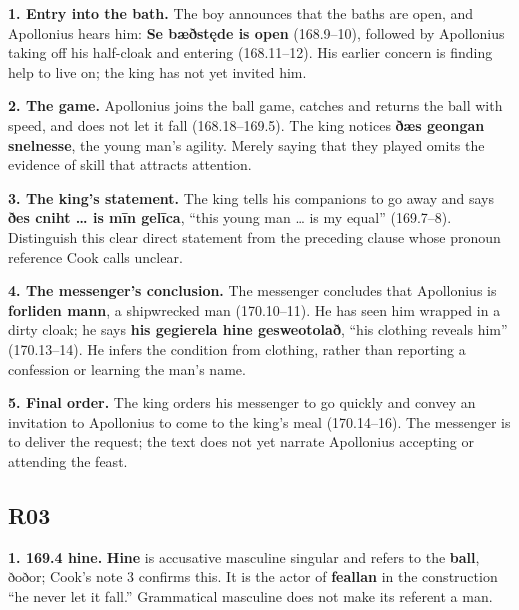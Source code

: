\textbf{1. Entry into the bath.} The boy announces that the baths are open, and Apollonius hears him: \textbf{Se bæðstęde is open} (168.9–10), followed by Apollonius taking off his half-cloak and entering (168.11–12). His earlier concern is finding help to live on; the king has not yet invited him.

\textbf{2. The game.} Apollonius joins the ball game, catches and returns the ball with speed, and does not let it fall (168.18–169.5). The king notices \textbf{ðæs geongan snelnesse}, the young man’s agility. Merely saying that they played omits the evidence of skill that attracts attention.

\textbf{3. The king's statement.} The king tells his companions to go away and says \textbf{ðes cniht … is mīn gelīca}, “this young man … is my equal” (169.7–8). Distinguish this clear direct statement from the preceding clause whose pronoun reference Cook calls unclear.

\textbf{4. The messenger's conclusion.} The messenger concludes that Apollonius is \textbf{forliden mann}, a shipwrecked man (170.10–11). He has seen him wrapped in a dirty cloak; he says \textbf{his gegierela hine gesweotolað}, “his clothing reveals him” (170.13–14). He infers the condition from clothing, rather than reporting a confession or learning the man’s name.

\textbf{5. Final order.} The king orders his messenger to go quickly and convey an invitation to Apollonius to come to the king’s meal (170.14–16). The messenger is to deliver the request; the text does not yet narrate Apollonius accepting or attending the feast.

\subsection*{R03}

\textbf{1. 169.4 hine.} \textbf{Hine} is accusative masculine singular and refers to the \textbf{ball}, ðoðor; Cook’s note 3 confirms this. It is the actor of \textbf{feallan} in the construction “he never let it fall.” Grammatical masculine does not make its referent a man.

